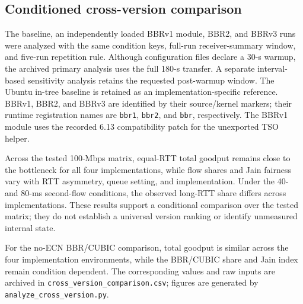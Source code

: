 \subsection{Conditioned cross-version comparison}
The baseline, an independently loaded BBRv1 module, BBR2, and BBRv3 runs were analyzed with the same condition
keys, full-run receiver-summary window, and five-run repetition rule.
Although configuration files declare a 30-s warmup, the archived primary
analysis uses the full 180-s transfer. A separate interval-based
sensitivity analysis retains the requested post-warmup window. The Ubuntu in-tree
baseline is retained as an implementation-specific reference. BBRv1,
BBR2, and BBRv3 are identified by their source/kernel markers; their runtime
registration names are \texttt{bbr1}, \texttt{bbr2}, and \texttt{bbr},
respectively. The BBRv1 module uses the recorded 6.13 compatibility patch
for the unexported TSO helper.

Across the tested 100-Mbps matrix, equal-RTT total goodput remains close to
the bottleneck for all four implementations, while flow shares and Jain
fairness vary with RTT asymmetry, queue setting, and implementation. Under
the 40- and 80-ms second-flow conditions, the observed long-RTT share differs across implementations. These results support a
conditional comparison over the tested matrix; they do not establish a
universal version ranking or identify unmeasured internal state.

For the no-ECN BBR/CUBIC comparison, total goodput is similar across the
four implementation environments, while the BBR/CUBIC share and Jain
index remain condition dependent. The corresponding values and raw inputs
are archived in \texttt{cross\_version\_comparison.csv}; figures are generated by
\texttt{analyze\_cross\_version.py}.
